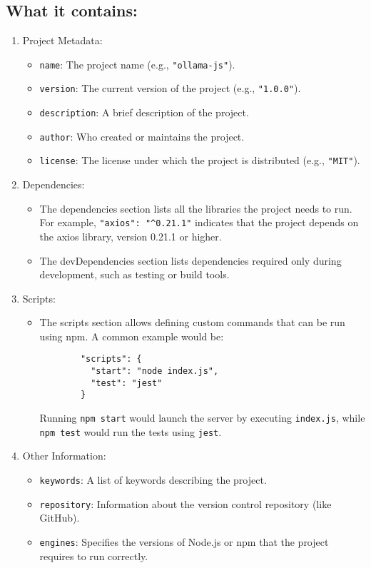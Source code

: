 \documentclass{article}
\begin{document}
\subsection{What it contains:}
\begin{enumerate}
    \item Project Metadata:
    \begin{itemize}
        \item \texttt{name}: The project name (e.g., \texttt{"ollama-js"}).
        \item \texttt{version}: The current version of the project (e.g., \texttt{"1.0.0"}).
        \item \texttt{description}: A brief description of the project.
        \item \texttt{author}: Who created or maintains the project.
        \item \texttt{license}: The license under which the project is distributed (e.g., \texttt{"MIT"}).
    \end{itemize}
    \item Dependencies:
    \begin{itemize}
        \item The dependencies section lists all the libraries the project needs to run. For example, \texttt{"axios": "\^{}0.21.1"} indicates that the project depends on the axios library, version 0.21.1 or higher.
        \item The devDependencies section lists dependencies required only during development, such as testing or build tools.
    \end{itemize}
    \item Scripts:
    \begin{itemize}
        \item The scripts section allows defining custom commands that can be run using npm. A common example would be:

        \begin{verbatim}
        "scripts": {
          "start": "node index.js",
          "test": "jest"
        }
        \end{verbatim}
        Running \texttt{npm start} would launch the server by executing \texttt{index.js}, while \texttt{npm test} would run the tests using \texttt{jest}.
    \end{itemize}
    \item Other Information:
    \begin{itemize}
        \item \texttt{keywords}: A list of keywords describing the project.
        \item \texttt{repository}: Information about the version control repository (like GitHub).
        \item \texttt{engines}: Specifies the versions of Node.js or npm that the project requires to run correctly.
    \end{itemize}
\end{enumerate}
\end{document}
